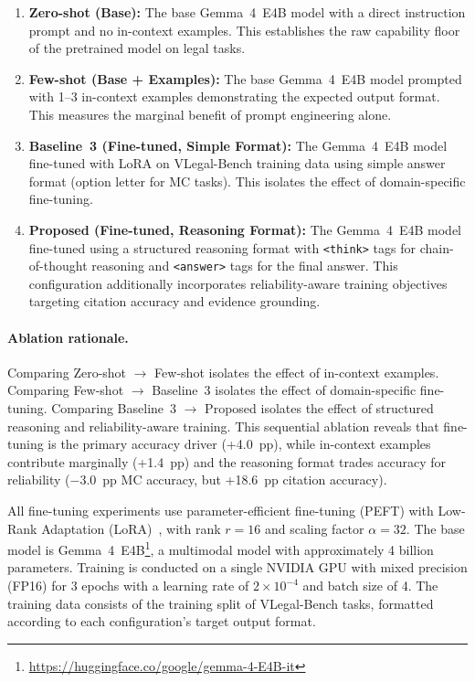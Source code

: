 \documentclass[11pt,a4paper]{article}
\newcommand{\system}{VLegal-Bench}
\newcommand{\model}{Gemma~4~E4B}
\begin{document}
\begin{enumerate}[leftmargin=*, itemsep=2pt]
    \item \textbf{Zero-shot (Base):} The base \model{} model with a direct instruction prompt and no in-context examples. This establishes the raw capability floor of the pretrained model on legal tasks.

    \item \textbf{Few-shot (Base + Examples):} The base \model{} model prompted with 1--3 in-context examples demonstrating the expected output format. This measures the marginal benefit of prompt engineering alone.

    \item \textbf{Baseline~3 (Fine-tuned, Simple Format):} The \model{} model fine-tuned with LoRA on \system{} training data using simple answer format (option letter for MC tasks). This isolates the effect of domain-specific fine-tuning.

    \item \textbf{Proposed (Fine-tuned, Reasoning Format):} The \model{} model fine-tuned using a structured reasoning format with \texttt{<think>} tags for chain-of-thought reasoning and \texttt{<answer>} tags for the final answer. This configuration additionally incorporates reliability-aware training objectives targeting citation accuracy and evidence grounding.
\end{enumerate}

\paragraph{Ablation rationale.}
Comparing Zero-shot $\rightarrow$ Few-shot isolates the effect of in-context examples.
Comparing Few-shot $\rightarrow$ Baseline~3 isolates the effect of domain-specific fine-tuning.
Comparing Baseline~3 $\rightarrow$ Proposed isolates the effect of structured reasoning and reliability-aware training.
This sequential ablation reveals that fine-tuning is the primary accuracy driver (+4.0~pp), while in-context examples contribute marginally (+1.4~pp) and the reasoning format trades accuracy for reliability ($-$3.0~pp MC accuracy, but +18.6~pp citation accuracy).

All fine-tuning experiments use parameter-efficient fine-tuning (PEFT) with Low-Rank Adaptation (LoRA)~\citep{hu2022lora}, with rank $r=16$ and scaling factor $\alpha=32$.
The base model is \model{}\footnote{\url{https://huggingface.co/google/gemma-4-E4B-it}}, a multimodal model with approximately 4 billion parameters.
Training is conducted on a single NVIDIA GPU with mixed precision (FP16) for 3 epochs with a learning rate of $2 \times 10^{-4}$ and batch size of 4.
The training data consists of the training split of \system{} tasks, formatted according to each configuration's target output format.
\end{document}
